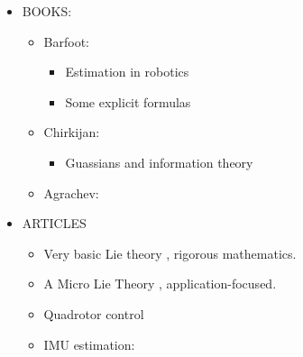 \begin{itemize}
  \item BOOKS:
        \begin{itemize}
          \item Barfoot: \cite{barfoot_state_2017}
                \begin{itemize}
                  \item Estimation in robotics
                  \item Some explicit formulas
                \end{itemize}
          \item Chirkijan: \cite{chirikjian_stochastic_2012, chirikjian_stochastic_2009}
                \begin{itemize}
                  \item Guassians and information theory
                \end{itemize}
          \item Agrachev: \cite{agrachev_control_2004}
        \end{itemize}

  \item ARTICLES
        \begin{itemize}
          \item Very basic Lie theory \cite{howe_very_1983}, rigorous mathematics.
          \item A Micro Lie Theory \cite{sola_micro_2018}, application-focused.
          \item Quadrotor control \cite{Lee2015}
          \item IMU estimation: \cite{hua_implementation_2014, mahony_nonlinear_2008}
        \end{itemize}
\end{itemize}
